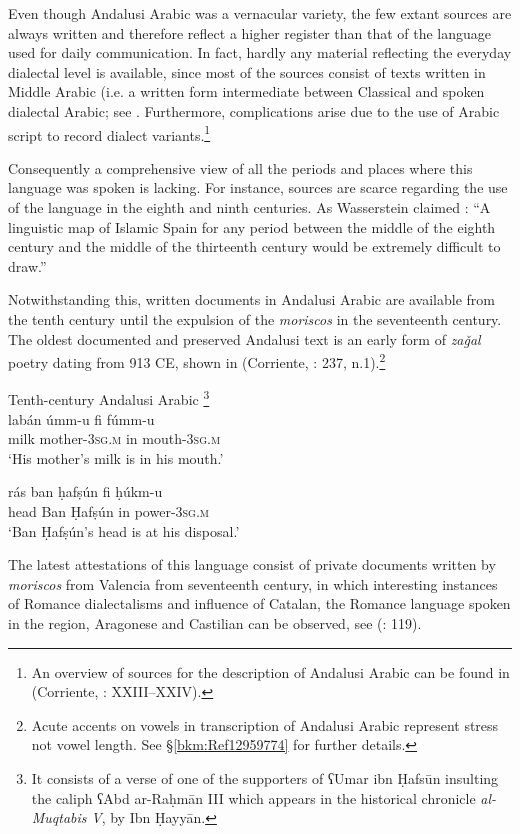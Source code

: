 \documentclass[output=paper,modfonts,nonflat]{langsci/langscibook}
\begin{document}
Even though Andalusi Arabic was a vernacular variety, the few extant sources are always written and therefore reflect a higher register than that of the language used for daily communication. In fact, hardly any material reflecting the everyday dialectal level is available, since most of the sources consist of texts written in Middle Arabic (i.e. a written form intermediate between Classical and spoken dialectal Arabic; see \citep{Lentin2011}. Furthermore, complications arise due to the use of Arabic script to record dialect variants.\footnote{An overview of sources for the description of Andalusi Arabic can be found in (Corriente, \citealt{PereiraVicente2015}: XXIII–XXIV).} \textsuperscript{}  

Consequently a comprehensive view of all the periods and places where this language was spoken is lacking. For instance, sources are scarce regarding the use of the language in the eighth and ninth centuries. As Wasserstein claimed \citep[3]{Wasserstein1991}: “A linguistic map of Islamic Spain for any period between the middle of the eighth century and the middle of the thirteenth century would be extremely difficult to draw.”

Notwithstanding this, written documents in Andalusi Arabic are available from the tenth century until the expulsion of the \textit{moriscos} in the seventeenth century. The oldest documented and preserved Andalusi text is an early form of \textit{zaǧal} poetry dating from 913 CE, shown in (Corriente, \citealt{PereiraVicente2015}: 237, n.1).\footnote{Acute accents on vowels in transcription of Andalusi Arabic represent stress not vowel length. See §\ref{bkm:Ref12959774} for further details.}


\ea\label{ex:key:}
Tenth-century Andalusi Arabic \footnote{It consists of a verse of one of the supporters of ʕUmar ibn Ḥafsūn insulting the caliph ʕAbd ar-Raḥmān III which appears in the historical chronicle \textit{al-Muqtabis} \textit{V}, by Ibn Ḥayyān.} \\
\ea \gll labán úmm-u fi fúmm-u\\
     milk mother-\textsc{3sg.m} in mouth-\textsc{3sg.m}\\
\glt ‘His mother’s milk is in his mouth.’

\ex\label{ex:key:}
\gll rás ban ḥafṣún fi ḥúkm-u \\
head Ban Ḥafṣún in power-\textsc{3sg.m}\\
\glt ‘Ban Ḥafṣún’s head is at his disposal.’
\z
\z

The latest attestations of this language consist of private documents written by \textit{moriscos} from Valencia from seventeenth century, in which interesting instances of Romance dialectalisms and influence of Catalan, the Romance language spoken in the region, Aragonese and Castilian can be observed, see (\citealt{BarcelóLabarta2009}: 119).
\end{document}
